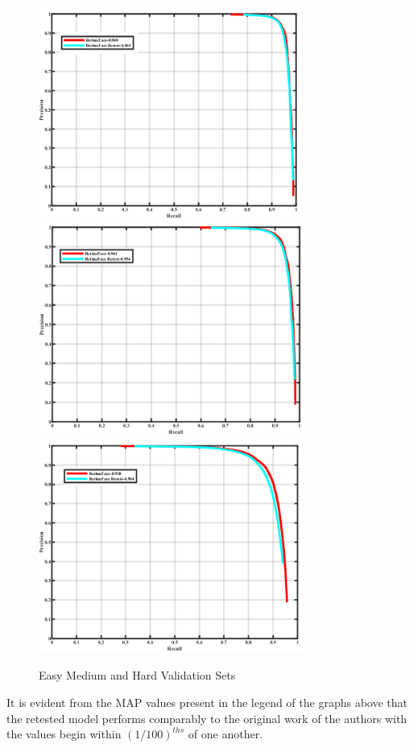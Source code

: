 \documentclass{article}
\begin{document}
\begin{figure}[H]
		\includegraphics[height=7cm]{wider_pr_cruve_int_easy_val.png}
				\includegraphics[height=7cm]{wider_pr_cruve_int_medium_val.png}
						\includegraphics[height=7cm]{wider_pr_cruve_int_hard_val.png}
		\caption{Easy Medium and Hard Validation Sets}
\end{figure}

It is evident from the MAP values present in the legend of the graphs above that the retested model performs comparably to the original work of the authors with the values begin within $(1/100)^{ths}$ of one another.
\end{document}
